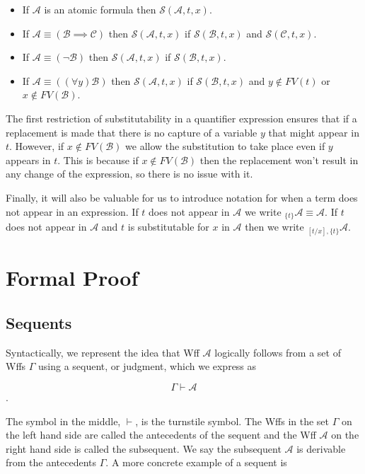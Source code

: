 \documentclass[12pt]{article}
\newcommand{\mc}[1]{\mathcal{#1}}
\begin{document}
\hrulefill
\begin{itemize}
\item{If $\mc{A}$ is an atomic formula then $\mc{S}(\mc{A}, t, x)$.}
\item{If $\mc{A} \equiv (\mc{B} \implies \mc{C})$ then $\mc{S}(\mc{A}, t, x)$ if $\mc{S}(\mc{B}, t, x)$ and $\mc{S}(\mc{C}, t, x)$.}
\item{If $\mc{A} \equiv (\lnot \mc{B})$ then $\mc{S}(\mc{A}, t, x)$ if $\mc{S}(\mc{B}, t, x)$.}
\item{If $\mc{A} \equiv ((\forall y)\mc{B})$ then $\mc{S}(\mc{A}, t, x)$ if $\mc{S}(\mc{B}, t, x)$ and $y\not\in FV(t)$ or $x\not \in FV(\mc{B})$.}
\end{itemize}
\hrulefill

The first restriction of substitutability in a quantifier expression ensures that if a replacement is made that there is no capture of a variable $y$ that might appear in $t$.
However, if $x \not \in FV(\mc{B})$ we allow the substitution to take place even if $y$ appears in $t$.
This is because if $x\not \in FV(\mc{B})$ then the replacement won't result in any change of the expression, so there is no issue with it. 

Finally, it will also be valuable for us to introduce notation for when a term does not appear in an expression.
If $t$ does not appear in $\mc{A}$ we write $_{\{t\}}\mc{A} \equiv \mc{A}$.
If $t$ does not appear in $\mc{A}$ and $t$ is substitutable for $x$ in $\mc{A}$ then we write $_{[t/x], \{t\}}\mc{A}$.

\newpage

\section{Formal Proof}
\subsection*{Sequents}
Syntactically, we represent the idea that Wff $\mc{A}$ logically follows from a set of Wffs $\Gamma$ using a sequent, or judgment, which we express as

$$\Gamma \vdash \mc{A}$$.

The symbol in the middle, $\vdash$, is the turnstile symbol.
The Wffs in the set $\Gamma$ on the left hand side are called the antecedents of the sequent and the Wff $\mc{A}$ on the right hand side is called the subsequent.
We say the subsequent $\mc{A}$ is derivable from the antecedents $\Gamma$.
A more concrete example of a sequent is 
\end{document}
